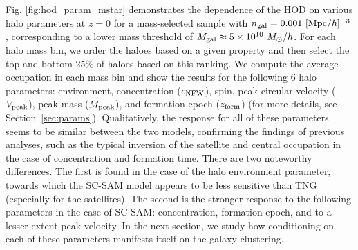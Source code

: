 \documentclass[fleqn,usenatbib]{mnras}
\newcommand{\rss}[1]{\textcolor{purple}{(rss: #1)}}
\begin{document}
Fig. \ref{fig:hod_param_mstar} demonstrates the dependence of the HOD on various halo parameters at $z = 0$ for a mass-selected sample with $n_{\rm gal} = 0.001 \ [{\rm Mpc}/h]^{-3}$, corresponding to a lower mass threshold of $M_{\rm gal} \approx 5 \times 10^{10} \ M_\odot/h$. 
For each halo mass bin, we order the haloes based on a given property and then select the top and bottom 25\% of haloes based on this ranking. We compute the average occupation in each mass bin and show the results for the following 6 halo parameters: environment, concentration ($c_{\rm NFW}$), spin, peak circular velocity ($V_{\rm peak}$),
peak mass ($M_{\rm peak}$), and formation epoch ($z_{\rm form}$) (for more details, see Section~\ref{sec:params}). 
Qualitatively, the response for all of these parameters seems to be similar between the two models, confirming the findings of previous analyses, such as the typical inversion of the satellite and central occupation in the case of concentration and formation time. There are two noteworthy differences. The first is found in the case of the halo environment parameter, towards which the SC-SAM model appears to be less sensitive than TNG (especially for the satellites). The second is the stronger response to the following parameters in the case of SC-SAM: concentration, formation epoch, and to a lesser extent peak velocity. 
In the next section, we study how conditioning on each of these parameters manifests itself on the galaxy clustering.
\end{document}
